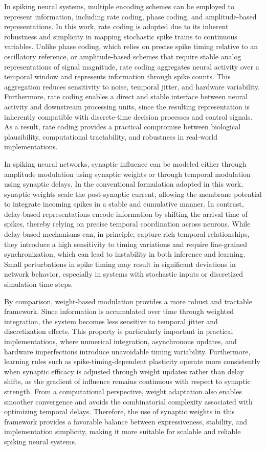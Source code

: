 In spiking neural systems, multiple encoding schemes can be employed to represent information, including rate coding, phase coding, and amplitude-based representations. In this work, rate coding is adopted due to its inherent robustness and simplicity in mapping stochastic spike trains to continuous variables. Unlike phase coding, which relies on precise spike timing relative to an oscillatory reference, or amplitude-based schemes that require stable analog representations of signal magnitude, rate coding aggregates neural activity over a temporal window and represents information through spike counts. This aggregation reduces sensitivity to noise, temporal jitter, and hardware variability. Furthermore, rate coding enables a direct and stable interface between neural activity and downstream processing units, since the resulting representation is inherently compatible with discrete-time decision processes and control signals. As a result, rate coding provides a practical compromise between biological plausibility, computational tractability, and robustness in real-world implementations.

In spiking neural networks, synaptic influence can be modeled either through amplitude modulation using synaptic weights or through temporal modulation using synaptic delays. In the conventional formulation adopted in this work, synaptic weights scale the post-synaptic current, allowing the membrane potential to integrate incoming spikes in a stable and cumulative manner. In contrast, delay-based representations encode information by shifting the arrival time of spikes, thereby relying on precise temporal coordination across neurons. While delay-based mechanisms can, in principle, capture rich temporal relationships, they introduce a high sensitivity to timing variations and require fine-grained synchronization, which can lead to instability in both inference and learning. Small perturbations in spike timing may result in significant deviations in network behavior, especially in systems with stochastic inputs or discretized simulation time steps.

By comparison, weight-based modulation provides a more robust and tractable framework. Since information is accumulated over time through weighted integration, the system becomes less sensitive to temporal jitter and discretization effects. This property is particularly important in practical implementations, where numerical integration, asynchronous updates, and hardware imperfections introduce unavoidable timing variability. Furthermore, learning rules such as spike-timing-dependent plasticity operate more consistently when synaptic efficacy is adjusted through weight updates rather than delay shifts, as the gradient of influence remains continuous with respect to synaptic strength. From a computational perspective, weight adaptation also enables smoother convergence and avoids the combinatorial complexity associated with optimizing temporal delays. Therefore, the use of synaptic weights in this framework provides a favorable balance between expressiveness, stability, and implementation simplicity, making it more suitable for scalable and reliable spiking neural systems.


